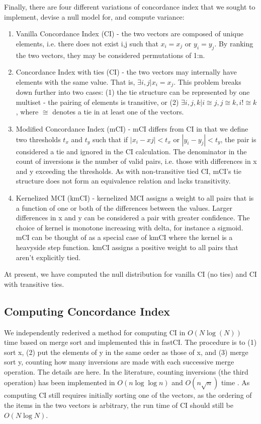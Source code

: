 \documentclass{article}
\begin{document}
Finally, there are four different variations of concordance index that we sought to implement, devise a null model for, and compute variance:
\begin{enumerate}
\item Vanilla Concordance Index (CI) - the two vectors are composed of unique elements, i.e. there does not exist i,j such that $x_{i} = x_{j}$ or $y_{i} = y_{j}$.  By ranking the two vectors, they may be considered permutations of 1:n.
\item Concordance Index with ties (CI) - the two vectors may internally have elements with the same value.  That is, $\exists i,j | x_{i} = x_{j}$.  This problem breaks down further into two cases: (1) the tie structure can be represented by one multiset - the pairing of elements is transitive, or (2) $\exists i,j,k | i \cong j, j \cong k, i !\cong k$, where $\cong$ denotes a tie in at least one of the vectors. 
\item Modified Concordance Index (mCI) - mCI differs from CI in that we define two thresholds $t_{x}$ and $t_{y}$ such that if $|x_{i} - x{j}| < t_{x}$ or $|y_{i} - y_{j}| < t_{y}$, the pair is considered a tie and ignored in the CI calculation.  The denominator in the count of inversions is the number of valid pairs, i.e. those with differences in x and y exceeding the thresholds.  As with non-transitive tied CI, mCI's tie structure does not form an equivalence relation and lacks transitivity. 
\item Kernelized MCI (kmCI) - kernelized MCI assigns a weight to all pairs that is a function of one or both of the differences between the values.  Larger differences in x and y can be considered a pair with greater confidence.  The choice of kernel is monotone increasing with delta, for instance a sigmoid.  mCI can be thought of as a special case of kmCI where the kernel is a heavyside step function.  kmCI assigns a positive weight to all pairs that aren't explicitly tied. 
\end{enumerate}
At present, we have computed the null distribution for vanilla CI (no ties) and CI with transitive ties.

\subsection{Computing Concordance Index}
We independently rederived a method for computing CI in $O(N \log(N))$ time based on merge sort and implemented this in fastCI.  The procedure is to (1) sort x, (2) put the elements of y in the same order as those of x, and (3) merge sort y, counting how many inversions are made with each successive merge operation.  The details are here.  In the literature, counting inversions (the third operation) has been implemented in $O(n \log \log n)$ and $O(n \sqrt{n})$ time \cite{Chan2010}.  As computing CI still requires initially sorting one of the vectors, as the ordering of the items in the two vectors is arbitrary, the run time of CI should still be $O(N \log N)$. 
\end{document}
